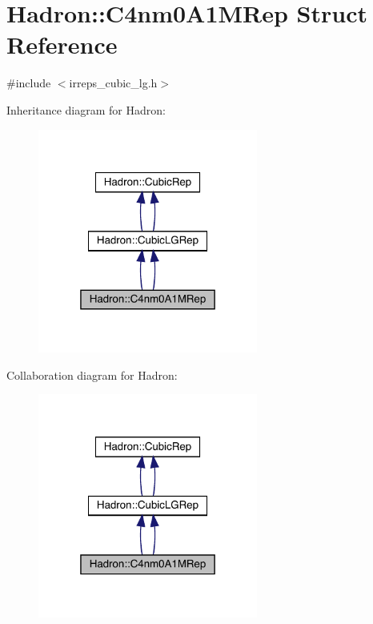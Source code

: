\hypertarget{structHadron_1_1C4nm0A1MRep}{}\section{Hadron\+:\+:C4nm0\+A1\+M\+Rep Struct Reference}
\label{structHadron_1_1C4nm0A1MRep}


{\ttfamily \#include $<$irreps\+\_\+cubic\+\_\+lg.\+h$>$}



Inheritance diagram for Hadron\+:\nopagebreak
\begin{figure}[H]
\begin{center}
\leavevmode
\includegraphics[width=205pt]{d0/da8/structHadron_1_1C4nm0A1MRep__inherit__graph}
\end{center}
\end{figure}


Collaboration diagram for Hadron\+:\nopagebreak
\begin{figure}[H]
\begin{center}
\leavevmode
\includegraphics[width=205pt]{d4/de5/structHadron_1_1C4nm0A1MRep__coll__graph}
\end{center}
\end{figure}
